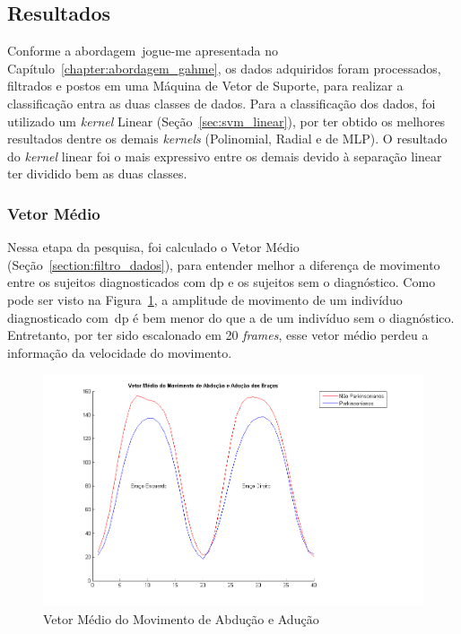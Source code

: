\subsection{Resultados}
Conforme a abordagem~\ac{jogue-me} apresentada no Capítulo~\ref{chapter:abordagem_gahme}, os dados adquiridos foram processados, filtrados e postos em uma Máquina de Vetor de Suporte, para realizar a classificação entra as duas classes de dados. Para a classificação dos dados, foi utilizado um \textit{kernel} Linear (Seção~\ref{sec:svm_linear}), por ter obtido os melhores resultados dentre os demais \textit{kernels} (Polinomial, Radial e de MLP). O resultado do \textit{kernel} linear foi o mais expressivo entre os demais devido à separação linear ter dividido bem as duas classes. 

\subsubsection{Vetor Médio}
Nessa etapa da pesquisa, foi calculado o Vetor Médio (Seção~\ref{section:filtro_dados}), para entender melhor a diferença de movimento entre os sujeitos diagnosticados com \ac{dp} e os sujeitos sem o diagnóstico. Como pode ser visto na Figura~\ref{fig:vetor_medio_abducao}, a amplitude de movimento de um indivíduo diagnosticado com~\ac{dp} é bem menor do que a de um indivíduo sem o diagnóstico. Entretanto, por ter sido escalonado em 20 \textit{frames}, esse vetor médio perdeu a informação da velocidade do movimento.

\begin{figure}[!htbp]
 \centering
 \includegraphics[scale=0.650]{./img/vetormedioaducao.png}
 \caption{Vetor Médio do Movimento de Abdução e Adução}
 \label{fig:vetor_medio_abducao}
\end{figure}


